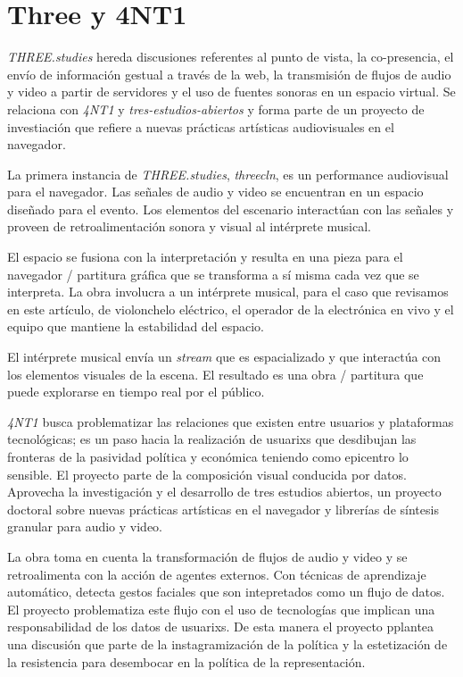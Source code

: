 
\section*{Three y 4NT1} %

\textit{THREE.studies} \citep{threestudies} hereda discusiones referentes al punto de vista, la co-presencia, el envío de información gestual a través de la web, la transmisión de flujos de audio y video a partir de servidores y el uso de fuentes sonoras en un espacio virtual. Se relaciona con \textit{4NT1} \citep{anti} y \textit{tres-estudios-abiertos} \citep{tresestudios} y forma parte de un proyecto de investiación que refiere a nuevas prácticas artísticas audiovisuales en el navegador.  

La primera instancia de \textit{THREE.studies}, \textit{threecln}, es un performance audiovisual para el navegador. Las señales de audio y video se encuentran en un espacio diseñado para el evento. Los elementos del escenario interactúan con las señales y proveen de retroalimentación sonora y visual al intérprete musical.

El espacio se fusiona con la interpretación y resulta en una pieza para el navegador / partitura gráfica que se transforma a sí misma cada vez que se interpreta. La obra involucra a un intérprete musical, para el caso que revisamos en este artículo, de violonchelo eléctrico, el operador de la electrónica en vivo y el equipo que mantiene la estabilidad del espacio.

El intérprete musical envía un \textit{stream} que es espacializado y que interactúa con los elementos visuales de la escena. El resultado es una obra / partitura que puede explorarse en tiempo real por el público. 

\textit{4NT1} busca problematizar las relaciones que existen entre usuarios y plataformas tecnológicas; es un paso hacia la realización de usuarixs que desdibujan las fronteras de la pasividad política y económica teniendo como epicentro lo sensible. El proyecto parte de la composición visual conducida por datos. Aprovecha la investigación y el desarrollo de tres estudios abiertos, un proyecto doctoral sobre nuevas prácticas artísticas en el navegador y librerías de síntesis granular para audio y video.

La obra toma en cuenta la transformación de flujos de audio y video y se retroalimenta con la acción de agentes externos. Con técnicas de aprendizaje automático, detecta gestos faciales que son intepretados como un flujo de datos. El proyecto problematiza este flujo con el uso de tecnologías que implican una responsabilidad de los datos de usuarixs. De esta manera el proyecto pplantea una discusión que parte de la instagramización de la política y la estetización de la resistencia para desembocar en la política de la representación.

